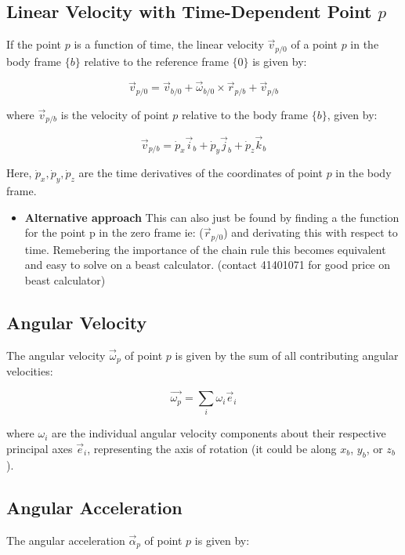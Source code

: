 \subsection{Linear Velocity with Time-Dependent Point \( p \)}

If the point \( p \) is a function of time, the linear velocity \( \vec{v}_{p/0} \) of a point \( p \) in the body frame \( \{b\} \) relative to the reference frame \( \{0\} \) is given by:

\[
\vec{v}_{p/0} = \vec{v}_{b/0} + \vec{\omega}_{b/0} \times \vec{r}_{p/b} + \vec{v}_{p/b}
\]

where \( \vec{v}_{p/b} \) is the velocity of point \( p \) relative to the body frame \( \{b\} \), given by:

\[
\vec{v}_{p/b} = \dot{p}_x \vec{i}_b + \dot{p}_y \vec{j}_b + \dot{p}_z \vec{k}_b
\]

Here, \( \dot{p}_x, \dot{p}_y, \dot{p}_z \) are the time derivatives of the coordinates of point \( p \) in the body frame.
    
\begin{itemize}
    \item \textbf{Alternative approach}
    This can also just be found by finding a the function for the point p in the zero frame ie:  (\( \vec{r}_{p/0} \)) and derivating this with respect to time. Remebering the importance of the chain rule this becomes equivalent and easy to solve on a beast calculator. (contact 41401071 for good price on beast calculator)
\end{itemize}


\subsection{Angular Velocity}

The angular velocity \( \vec{\omega}_{p} \) of point \( p \) is given by the sum of all contributing angular velocities:

\[
\vec{\omega_{p}} = \sum_{i} \omega_i \vec{e}_i
\]

where \( \omega_i \) are the individual angular velocity components about their respective principal axes \( \vec{e}_i \), representing the axis of rotation (it could be along $x_b$, $y_b$, or $z_b$).

\subsection{Angular Acceleration}

The angular acceleration \( \vec{\alpha}_{p} \) of point \( p \) is given by:

